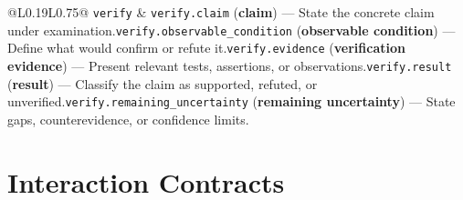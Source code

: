 \begin{longtable}{@{}L{0.19\linewidth}L{0.75\linewidth}@{}}
\texttt{verify} & \texttt{verify.claim} (\textbf{claim}) --- State the concrete claim under examination.\newline{}\texttt{verify.observable\_condition} (\textbf{observable condition}) --- Define what would confirm or refute it.\newline{}\texttt{verify.evidence} (\textbf{verification evidence}) --- Present relevant tests, assertions, or observations.\newline{}\texttt{verify.result} (\textbf{result}) --- Classify the claim as supported, refuted, or unverified.\newline{}\texttt{verify.remaining\_uncertainty} (\textbf{remaining uncertainty}) --- State gaps, counterevidence, or confidence limits. \\
\end{longtable}
\endgroup

\section{Interaction Contracts}\label{sec:interaction-contracts}

